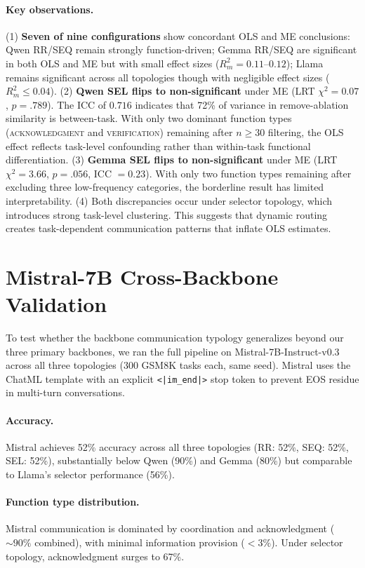 \paragraph{Key observations.} (1) \textbf{Seven of nine configurations} show concordant OLS and ME conclusions: Qwen RR/SEQ remain strongly function-driven; Gemma RR/SEQ are significant in both OLS and ME but with small effect sizes ($R^2_m = 0.11$--$0.12$); Llama remains significant across all topologies though with negligible effect sizes ($R^2_m \leq 0.04$). (2) \textbf{Qwen SEL flips to non-significant} under ME (LRT $\chi^2 = 0.07$, $p = .789$). The ICC of $0.716$ indicates that 72\% of variance in remove-ablation similarity is between-task. With only two dominant function types (\textsc{acknowledgment} and \textsc{verification}) remaining after $n \geq 30$ filtering, the OLS effect reflects task-level confounding rather than within-task functional differentiation. (3) \textbf{Gemma SEL flips to non-significant} under ME (LRT $\chi^2 = 3.66$, $p = .056$, ICC $= 0.23$). With only two function types remaining after excluding three low-frequency categories, the borderline result has limited interpretability. (4) Both discrepancies occur under selector topology, which introduces strong task-level clustering. This suggests that dynamic routing creates task-dependent communication patterns that inflate OLS estimates.

\section{Mistral-7B Cross-Backbone Validation}
\label{app:mistral}

To test whether the backbone communication typology generalizes beyond our three primary backbones, we ran the full pipeline on Mistral-7B-Instruct-v0.3 across all three topologies (300 GSM8K tasks each, same seed). Mistral uses the ChatML template with an explicit \texttt{<|im\_end|>} stop token to prevent EOS residue in multi-turn conversations.

\paragraph{Accuracy.} Mistral achieves 52\% accuracy across all three topologies (RR: 52\%, SEQ: 52\%, SEL: 52\%), substantially below Qwen (90\%) and Gemma (80\%) but comparable to Llama's selector performance (56\%).

\paragraph{Function type distribution.} Mistral communication is dominated by coordination and acknowledgment (${\sim}90\%$ combined), with minimal information provision ($<3\%$). Under selector topology, acknowledgment surges to 67\%.


